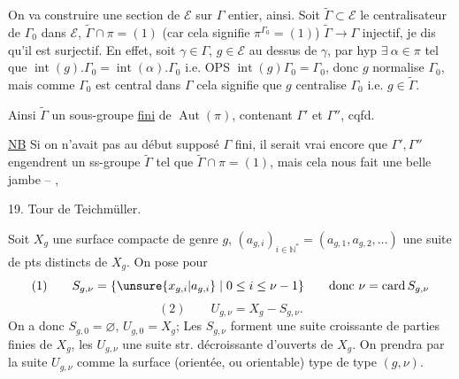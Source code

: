 On va construire une section de $\mathcal E$
sur $\Gamma$  entier, ainsi. Soit $\widetilde\Gamma\subset\mathcal E$
le centralisateur de $\Gamma_0$ dans $\mathcal E$, \unsure{$\Rightarrow$}
$\widetilde\Gamma\cap\pi=(1)$ (car cela signifie $\pi^{\Gamma_0}=(1)$)
 $\widetilde\Gamma\longrightarrow\Gamma$ injectif, je dis
qu'il est surjectif. En effet, soit
$\gamma\in\Gamma$, $g\in\mathcal E$ au dessus de $\gamma$, par hyp
$\exists\ \alpha\in\pi$ tel que $\operatorname{int}(g).\Gamma_0=\operatorname{int}(\alpha).\Gamma_0$
i.e. OPS $\operatorname{int}(g)\Gamma_0=\Gamma_0$, donc $g$ normalise
$\Gamma_0$, mais comme $\Gamma_0$ est central dans $\Gamma$
cela signifie que $g$ centralise $\Gamma_0$ i.e. $g\in\widetilde\Gamma$.

Ainsi $\widetilde\Gamma$ \inserted{$\simeq\Gamma$}  un sous-groupe \uline{fini} de $\operatorname{Aut}(\pi)$,
 contenant $\Gamma'$ et $\Gamma''$, cqfd.

\uline{NB} Si on n'avait pas au début supposé
$\Gamma$ fini, il serait vrai encore que $\Gamma',\Gamma''$
engendrent un ss-groupe $\widetilde\Gamma$  tel que
$\widetilde\Gamma\cap\pi=(1)$, mais cela nous fait une
belle jambe -- ,

19. Tour de Teichmüller.

Soit  $X_g$ une surface compacte  de
genre $g$, 
\unsure{$[$|$]$} $(a_{g,i})_{i\in\mathbb N^*}=(a_{g,1},a_{g,2},\ldots)$ \unsure{$]$|$[$}
une suite de
pts distincts de $X_g$. On pose pour 
\[
(1)\qquad S_{g,\nu}=\{\unsure{x_{g,i}|a_{g,i}}\mid 0\leq i\leq\nu-1\}
\qquad\text{donc }\nu=\operatorname{card}S_{g,\nu}
\]
\[
(2)\qquad U_{g,\nu}=X_g-S_{g,\nu}.
\]
On a donc $S_{g,0}=\varnothing$, $U_{g,0}=X_g$; Les $S_{g,\nu}$ forment
une suite  croissante de parties finies de $X_g$,
les $U_{g,\nu}$ une suite str. décroissante d'ouverts
de $X_g$. On prendra par la suite $U_{g,\nu}$ comme
la surface (orientée, ou orientable) type de
type $(g,\nu)$.

